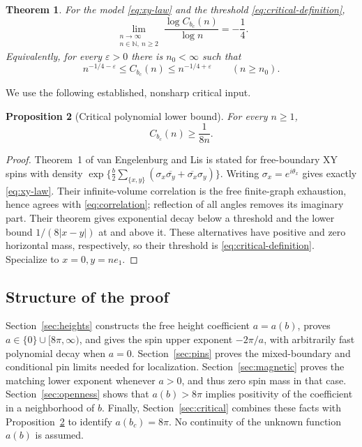 \documentclass[11pt]{article}
\numberwithin{equation}{section}
\newtheorem{theorem}{Theorem}[section]
\newtheorem{proposition}[theorem]{Proposition}
\theoremstyle{definition}
\theoremstyle{remark}
\newcommand{\N}{\mathbb N}
\newcommand{\eps}{\varepsilon}
\begin{document}
\begin{theorem}\label{thm:main}
For the model \eqref{eq:xy-law} and the threshold
\eqref{eq:critical-definition},
\[
 \lim_{\substack{n\to\infty\\n\in\N,\ n\ge2}}
       \frac{\log C_{b_c}(n)}{\log n}=-\frac14.
\]
Equivalently, for every \(\eps>0\) there is \(n_0<\infty\) such that
\[
 n^{-1/4-\eps}\le C_{b_c}(n)\le n^{-1/4+\eps}
 \qquad(n\ge n_0).
\]
\end{theorem}

We use the following established, nonsharp critical input.
\begin{proposition}[Critical polynomial lower bound]\label{prop:critical-lower}
For every \(n\ge1\),
\[
 C_{b_c}(n)\ge\frac1{8n}.
\]
\end{proposition}
\begin{proof}
Theorem~1 of van Engelenburg and Lis \cite{vEL} is stated for
free-boundary XY spins with density
\(\exp\{\frac b2\sum_{\{x,y\}}
(\sigma_x\overline{\sigma_y}+
 \overline{\sigma_x}\sigma_y)\}\).
Writing \(\sigma_x=e^{i\theta_x}\) gives exactly
\eqref{eq:xy-law}. Their infinite-volume correlation is the free
finite-graph exhaustion, hence agrees with \eqref{eq:correlation};
reflection of all angles removes its imaginary part. Their theorem
gives exponential decay below a threshold and the lower bound
\(1/(8|x-y|)\) at and above it. These alternatives have positive
and zero horizontal mass, respectively, so their threshold is
\eqref{eq:critical-definition}. Specialize to \(x=0,y=ne_1\).
\end{proof}

\subsection{Structure of the proof}
Section~\ref{sec:heights} constructs the free height coefficient
\(a=a(b)\), proves \(a\in\{0\}\cup[8\pi,\infty)\), and gives the
spin upper exponent \(-2\pi/a\), with arbitrarily fast polynomial
decay when \(a=0\). Section~\ref{sec:pins} proves the mixed-boundary
and conditional pin limits needed for localization.
Section~\ref{sec:magnetic} proves the matching lower exponent
whenever \(a>0\), and thus zero spin mass in that case.
Section~\ref{sec:openness} shows that \(a(b)>8\pi\) implies
positivity of the coefficient in a neighborhood of \(b\).
Finally, Section~\ref{sec:critical} combines these facts with
Proposition~\ref{prop:critical-lower} to identify \(a(b_c)=8\pi\).
No continuity of the unknown function \(a(b)\) is assumed.
\end{document}
